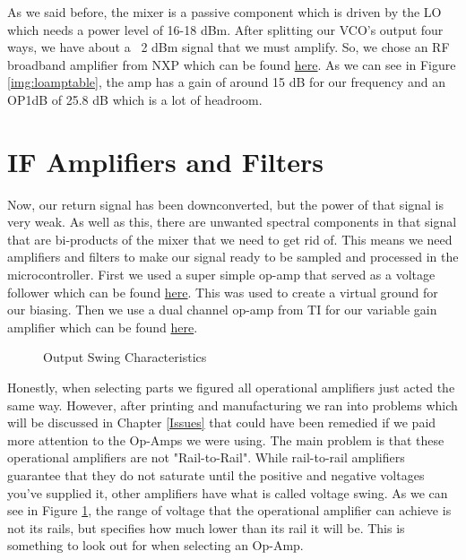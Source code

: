 As we said before, the mixer is a passive component which is driven by the LO which needs a power level of 16-18 dBm.
After splitting our VCO's output four ways, we have about a ~2 dBm signal that we must amplify. So, we chose an RF broadband
amplifier from NXP which can be found \href{https://www.digikey.com/en/products/detail/nxp-usa-inc/MMG3014NT1/1971761}{here}. As
we can see in Figure \ref{img:loamptable}, the amp has a gain of around 15 dB for our frequency and an OP1dB of 25.8 dB which is
a lot of headroom.

\section{IF Amplifiers and Filters}
Now, our return signal has been downconverted, but the power of that signal is very weak. As well as this, there are unwanted
spectral components in that signal that are bi-products of the mixer that we need to get rid of. This means we need amplifiers and
filters to make our signal ready to be sampled and processed in the microcontroller. First we used a super simple op-amp
that served as a voltage follower which can be found \href{https://www.digikey.com/en/products/detail/microchip-technology/MCP6001UT-I-OT/562450}{here}.
This was used to create a virtual ground for our biasing. Then we use a dual channel op-amp from TI for our variable gain
amplifier which can be found \href{https://www.mouser.com/ProductDetail/Texas-Instruments/LM2904DR?qs=5BZzbFV4k2vkQqOl3Q8qPg%3D%3D}{here}.

\begin{figure}[H]
  \centering
  \caption{Output Swing Characteristics}
  \label{img:outputswing}
\end{figure}

Honestly, when selecting parts we figured all operational amplifiers just acted the same way. However, after printing and manufacturing
we ran into problems which will be discussed in Chapter \ref{Issues} that could have been remedied if we paid more attention to
the Op-Amps we were using. The main problem is that these operational amplifiers are not "Rail-to-Rail".
While rail-to-rail amplifiers guarantee that they do not saturate until the positive and negative voltages you've supplied it,
other amplifiers have what is called voltage swing. As we can see in Figure \ref{img:outputswing}, the range of voltage
that the operational amplifier can achieve is not its rails, but specifies how much lower than its rail it will be. This is 
something to look out for when selecting an Op-Amp.

